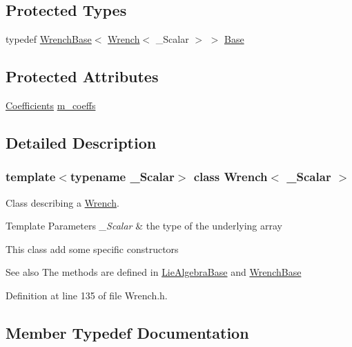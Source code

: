 \subsection*{Protected Types}
\begin{DoxyCompactItemize}
\item 
typedef \hyperlink{class_wrench_base}{Wrench\+Base}$<$ \hyperlink{class_wrench}{Wrench}$<$ \+\_\+\+Scalar $>$ $>$ \hyperlink{class_wrench_a4f3f84e4c6510bc7c0613d9bcb784015}{Base}
\end{DoxyCompactItemize}
\subsection*{Protected Attributes}
\begin{DoxyCompactItemize}
\item 
\hyperlink{class_wrench_a3b7401ec055bd386fc3dc826308784e8}{Coefficients} \hyperlink{class_wrench_a3314bb14c83d52d863490c9460cacbce}{m\+\_\+coeffs}
\end{DoxyCompactItemize}


\subsection{Detailed Description}
\subsubsection*{template$<$typename \+\_\+\+Scalar$>$\newline
class Wrench$<$ \+\_\+\+Scalar $>$}

Class describing a \hyperlink{class_wrench}{Wrench}. 


\begin{DoxyTemplParams}{Template Parameters}
{\em \+\_\+\+Scalar} & the type of the underlying array\\
\hline
\end{DoxyTemplParams}
This class add some specific constructors

\begin{DoxySeeAlso}{See also}
The methods are defined in \hyperlink{class_lie_algebra_base}{Lie\+Algebra\+Base} and \hyperlink{class_wrench_base}{Wrench\+Base} 
\end{DoxySeeAlso}


Definition at line 135 of file Wrench.\+h.



\subsection{Member Typedef Documentation}
\hypertarget{class_wrench_a4f3f84e4c6510bc7c0613d9bcb784015}{}\label{class_wrench_a4f3f84e4c6510bc7c0613d9bcb784015} 
